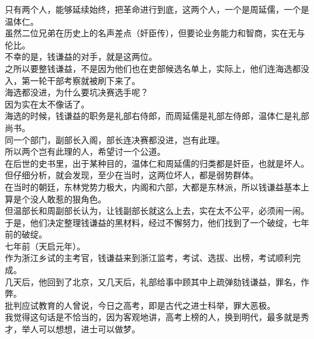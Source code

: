 \begin{multicols}{\theparacolNo}
只有两个人，能够延续始终，把革命进行到底，这两个人，一个是周延儒，一个是温体仁。\\

虽然二位兄弟在历史上的名声差点（奸臣传），但要论业务能力和智商，实在无与伦比。\\

不幸的是，钱谦益的对手，就是这两位。\\

之所以要整钱谦益，不是因为他们也在吏部候选名单上，实际上，他们连海选都没入，第一轮干部考察就被刷下来了。\\

海选都没进，为什么要坑决赛选手呢？\\

因为实在太不像话了。\\

海选的时候，钱谦益的职务是礼部右侍郎，而周延儒是礼部左侍郎，温体仁是礼部尚书。\\

同一个部门，副部长入阁，部长连决赛都没进，岂有此理。\\

所以两个岂有此理的人，希望讨一个公道。\\

在后世的史书里，出于某种目的，温体仁和周延儒的归类都是奸臣，也就是坏人。但仔细分析，就会发现，至少在当时，这两位坏人，都是弱势群体。\\

在当时的朝廷，东林党势力极大，内阁和六部，大都是东林派，所以钱谦益基本上算是个没人敢惹的狠角色。\\

但温部长和周副部长认为，让钱副部长就这么上去，实在太不公平，必须闹一闹。\\

于是，他们决定整理钱谦益的黑材料，经过不懈努力，他们找到了一个破绽，七年前的破绽。\\

七年前（天启元年）。\\

作为浙江乡试的主考官，钱谦益来到浙江监考，考试、选拔、出榜，考试顺利完成。\\

几天后，他回到了北京，又几天后，礼部给事中顾其中上疏弹劾钱谦益，罪名，作弊。\\

批判应试教育的人曾说，今日之高考，即是古代之进士科举，罪大恶极。\\

我觉得这句话是不恰当的，因为客观地讲，高考上榜的人，换到明代，最多就是秀才，举人可以想想，进士可以做梦。\\


\end{multicols}
